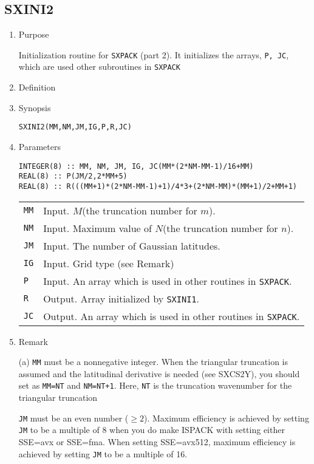 \documentclass[a4paper]{scrartcl}
\begin{document}
\subsection{SXINI2}

\begin{enumerate}

\item Purpose

Initialization routine for \texttt{SXPACK} (part 2).
It initializes the arrays, \texttt{P, JC},
which are used other subroutines in \texttt{SXPACK}

\item Definition

\item Synopsis 
    
\texttt{SXINI2(MM,NM,JM,IG,P,R,JC)}

\item Parameters
\begin{verbatim}  
INTEGER(8) :: MM, NM, JM, IG, JC(MM*(2*NM-MM-1)/16+MM)
REAL(8) :: P(JM/2,2*MM+5)
REAL(8) :: R(((MM+1)*(2*NM-MM-1)+1)/4*3+(2*NM-MM)*(MM+1)/2+MM+1)
\end{verbatim}  
    
\begin{tabular}{ll}
\texttt{MM} & Input. $M$(the truncation number for $m$).\\
\texttt{NM} & Input. Maximum value of $N$(the truncation 
  number for $n$).\\
\texttt{JM}  & Input. The number of Gaussian latitudes.\\
\texttt{IG}  & Input. Grid type (see Remark)\\
\texttt{P}  & Input. An array which is used in other routines in \texttt{SXPACK}.\\
\texttt{R}  & Output. Array initialized by \texttt{SXINI1}.\\
\texttt{JC}  & Output. An array which is used in other routines in \texttt{SXPACK}.
\end{tabular}

\item Remark

(a) \texttt{MM} must be a nonnegative integer.
 When the triangular truncation is assumed and
 the latitudinal derivative is needed (see SXCS2Y),
 you should set as \texttt{MM=NT} and \texttt{NM=NT+1}.
 Here, \texttt{NT} is the truncation wavenumber for 
  the triangular truncation
  
\texttt{JM} must be an even number ($\ge 2$).
Maximum efficiency is achieved by setting \texttt{JM} to be 
a multiple of 8 when you do make ISPACK with setting either
SSE=avx or SSE=fma.
When setting SSE=avx512, maximum efficiency is achieved
by setting \texttt{JM} to be a multiple of 16.


\end{enumerate}
\end{document}
